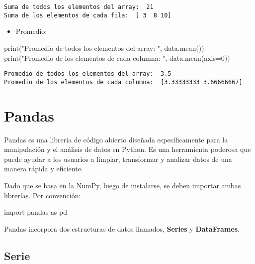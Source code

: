 \documentclass[
  letterpaper,
  DIV=11,
  numbers=noendperiod]{scrreprt}
\newenvironment{Shaded}{\begin{snugshade}}{\end{snugshade}}
\newcommand{\BuiltInTok}[1]{\textcolor[rgb]{0.00,0.23,0.31}{#1}}
\newcommand{\DecValTok}[1]{\textcolor[rgb]{0.68,0.00,0.00}{#1}}
\newcommand{\ImportTok}[1]{\textcolor[rgb]{0.00,0.46,0.62}{#1}}
\newcommand{\NormalTok}[1]{\textcolor[rgb]{0.00,0.23,0.31}{#1}}
\newcommand{\OperatorTok}[1]{\textcolor[rgb]{0.37,0.37,0.37}{#1}}
\newcommand{\StringTok}[1]{\textcolor[rgb]{0.13,0.47,0.30}{#1}}
\providecommand{\tightlist}{%
  \setlength{\itemsep}{0pt}\setlength{\parskip}{0pt}}\usepackage{longtable,booktabs,array}
\begin{document}
\begin{verbatim}
Suma de todos los elementos del array:  21
Suma de los elementos de cada fila:  [ 3  8 10]
\end{verbatim}

\begin{itemize}
\tightlist
\item
  Promedio:
\end{itemize}

\begin{Shaded}
\begin{Highlighting}[]
\BuiltInTok{print}\NormalTok{(}\StringTok{"Promedio de todos los elementos del array: "}\NormalTok{, data.mean())}
\BuiltInTok{print}\NormalTok{(}\StringTok{"Promedio de los elementos de cada columna: "}\NormalTok{, data.mean(axis}\OperatorTok{=}\DecValTok{0}\NormalTok{))}
\end{Highlighting}
\end{Shaded}

\begin{verbatim}
Promedio de todos los elementos del array:  3.5
Promedio de los elementos de cada columna:  [3.33333333 3.66666667]
\end{verbatim}

\section{Pandas}\label{pandas}

Pandas es una librería de código abierto diseñada específicamente para
la manipulación y el análisis de datos en Python. Es una herramienta
poderosa que puede ayudar a los usuarios a limpiar, transformar y
analizar datos de una manera rápida y eficiente.

Dado que se basa en la NumPy, luego de instalarse, se deben importar
ambas librerías. Por convención:

\begin{Shaded}
\begin{Highlighting}[]
\ImportTok{import}\NormalTok{ pandas }\ImportTok{as}\NormalTok{ pd}
\end{Highlighting}
\end{Shaded}

Pandas incorpora dos estructuras de datos llamados, \textbf{Series} y
\textbf{DataFrames}.

\subsection{\texorpdfstring{\textbf{Serie}}{Serie}}\label{serie}
\end{document}
